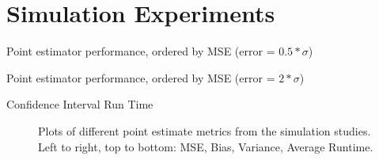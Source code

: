 
\section{Simulation Experiments}

\begin{table}[ht]
    \centering
    \caption{Point estimator performance, ordered by MSE (error = $0.5*\sigma$)}
    
    \label{tab:table-sim-exp-point-error0.5}
\end{table}

\begin{table}[ht]
    \centering
    \caption{Point estimator performance, ordered by MSE (error = $2*\sigma$)}
    
    \label{tab:table-sim-exp-point-error2}
\end{table}

\begin{table}[ht]
    \centering
    \caption{Confidence Interval Run Time}
    
    \label{tab:table-sim-exp-runtime}
\end{table}

\begin{figure}[ht]
    \centering
    
    \caption{Plots of different point estimate metrics from the simulation studies. Left to right, top to bottom: MSE, Bias, Variance, Average Runtime.}
    \label{fig:sim-exp-grid}
\end{figure}

